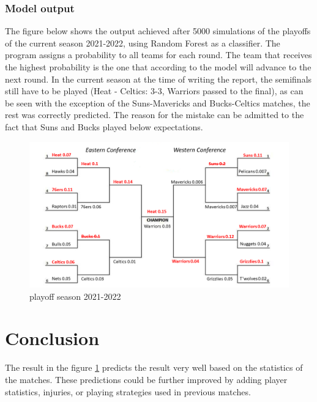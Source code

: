 \documentclass{article}
\begin{document}
\subsubsection{Model output}
The figure below shows the output achieved after 5000 simulations of the playoffs of the current season 2021-2022, using Random Forest as a classifier. The program assigns a probability to all teams for each round. The team that receives the highest probability is the one that according to the model will advance to the next round. In the current season at the time of writing the report, the semifinals still have to be played (Heat - Celtics: 3-3, Warriors passed to the final), as can be seen with the exception of the Suns-Mavericks and Bucks-Celtics matches, the rest was correctly predicted. The reason for the mistake can be admitted to the fact that Suns and Bucks played below  expectations.
\begin{figure}[h]
    \centering
    \includegraphics[width=\textwidth]{model/playoffs.png}
    \caption{playoff season 2021-2022}
    \label{fig:playoffSeason2022}
\end{figure}
\section{Conclusion}
The result in the figure \ref{fig:playoffSeason2022} predicts the result very well based on the statistics of the matches. These predictions could be further improved by adding player statistics, injuries, or playing strategies used in previous matches. 
\end{document}

